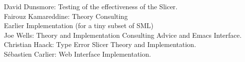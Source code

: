 \documentclass{article}
\begin{document}
	David Dunsmore: Testing of the effectiveness of the Slicer.\\

	Fairouz Kamareddine: Theory Consulting\\

Earlier Implementation (for a tiny subset of SML)\\

	Joe Wells: Theory and Implementation Consulting Advice and Emacs
	    	   Interface.\\

	Christian Haack: Type Error Slicer Theory and Implementation.\\

	Sébastien Carlier: Web Interface Implementation.
\end{document}
